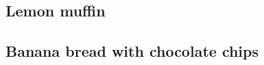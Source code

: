 \documentclass[a4paper, 12pt]{article}
\begin{document}
\subsection{Lemon muffin}

\subsection{Banana bread with chocolate chips}

\newpage
\end{document}
